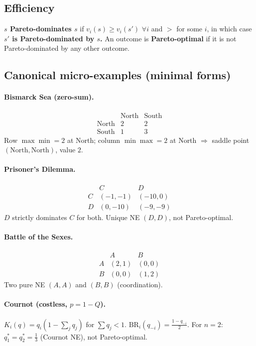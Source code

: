 \documentclass[9pt]{article}
\newcommand{\vi}{v_i}
\newcommand{\BR}{\mathrm{BR}}
\begin{document}
\subsection*{Efficiency}
\textbf{$s$ Pareto-dominates $s$} if $\vi(s)\ge \vi(s')$ $\forall i$ and $>$ for some $i$, in which case \textbf{$s'$ is Pareto-dominated by $s$.} An outcome is \textbf{Pareto-optimal} if it is not Pareto-dominated by any other outcome. 

\subsection*{Canonical micro-examples (minimal forms)}
\paragraph{Bismarck Sea (zero-sum).}
\[
\begin{array}{c|cc}
& \text{North} & \text{South}\\\hline
\text{North} & 2 & 2\\
\text{South} & 1 & 3
\end{array}
\]
Row $\max\min=2$ at North; column $\min\max=2$ at North $\Rightarrow$ saddle point $(\text{North},\text{North})$, value $2$.

\paragraph{Prisoner’s Dilemma.}
\[
\begin{array}{c|cc}
 & C & D\\\hline
C &(-1,-1)&(-10,0)\\
D &(0,-10)&(-9,-9)
\end{array}
\]
$D$ strictly dominates $C$ for both. Unique NE $(D,D)$, not Pareto-optimal.

\paragraph{Battle of the Sexes.}
\[
\begin{array}{c|cc}
 & A & B\\\hline
A&(2,1)&(0,0)\\
B&(0,0)&(1,2)
\end{array}
\]
Two pure NE $(A,A)$ and $(B,B)$ (coordination).

\paragraph{Cournot (costless, $p=1-Q$).} $K_i(q)=q_i(1-\sum_j q_j)$ for $\sum q_j<1$. $\BR_i(q_{-i})=\tfrac{1-q_{-i}}{2}$. For $n=2$: $q_1^*=q_2^*=\tfrac13$ (Cournot NE), not Pareto-optimal.
\end{document}
